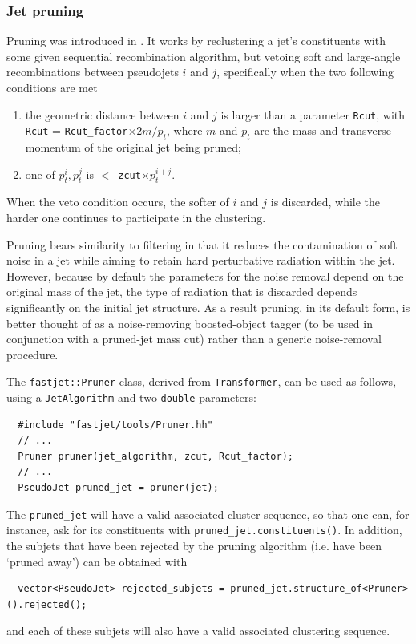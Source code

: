 \documentclass[12pt,a4]{article}
\newcommand{\ttt}[1]{{\small\texttt{#1}}}
\begin{document}
\subsubsection{Jet pruning}
\label{sec:pruning}

Pruning was introduced in \cite{Ellis:2009su}. 
%
It works by reclustering a jet's constituents with some given
sequential recombination algorithm, but vetoing soft and large-angle
recombinations between pseudojets $i$ and $j$, specifically when the
two following conditions are met
%
\begin{enumerate}
\item the geometric distance between $i$ and $j$ is larger than a
  parameter \ttt{Rcut}, with \ttt{Rcut} = \ttt{Rcut\_factor}$\times
  2m/p_t$, where $m$ and $p_t$ are the mass and transverse momentum of
  the original jet being pruned;
\item one of $p_t^i, p_t^j $ is $<$~\ttt{zcut}$\times p_t^{i+j}$.
\end{enumerate}
When the veto condition occurs, the softer of $i$ and $j$ is
discarded, while the harder one continues to participate in the
clustering.

Pruning bears similarity to filtering in that it reduces the
contamination of soft noise in a jet while aiming to retain hard
perturbative radiation within the jet.
%
However, because by default the parameters for the noise removal
depend on the original mass of the jet, the type of radiation that is
discarded depends significantly on the initial jet structure.
%
As a result pruning, in its default form, is better thought of as a
noise-removing boosted-object tagger (to be used in conjunction with a
pruned-jet mass cut) rather than a generic noise-removal procedure.
%

The \ttt{fastjet::Pruner} class, derived from \ttt{Transformer}, can be used as
follows, using a \ttt{JetAlgorithm} and two \ttt{double} parameters:
\begin{lstlisting}
  #include "fastjet/tools/Pruner.hh"
  // ...
  Pruner pruner(jet_algorithm, zcut, Rcut_factor);
  // ...
  PseudoJet pruned_jet = pruner(jet);
\end{lstlisting}
The \ttt{pruned\_jet} will have a valid associated cluster sequence, so that one
can, for instance, ask for its constituents with
\ttt{pruned\_jet.constituents()}.
%
In addition, the subjets that have been rejected by the pruning algorithm (i.e.
have been `pruned away') can be obtained with
\begin{lstlisting}
  vector<PseudoJet> rejected_subjets = pruned_jet.structure_of<Pruner>().rejected();
\end{lstlisting}
and each of these subjets will also have a valid associated clustering sequence.
\end{document}
